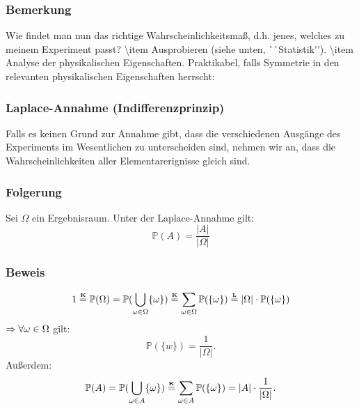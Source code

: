 \subsubsection{Bemerkung}
Wie findet man nun das richtige Wahrscheinlichkeitsma\ss{}, d.h. jenes, welches zu meinem Experiment passt?
\num{
\item Ausprobieren (siehe unten, ``Statistik'').
\item Analyse der physikalischen Eigenschaften. Praktikabel, falls Symmetrie in den relevanten physikalischen Eigenschaften herrscht:
}
\subsubsection{Laplace-Annahme (Indifferenzprinzip)}
Falls es keinen Grund zur Annahme gibt, dass die verschiedenen Ausg\"ange des Experiments im Wesentlichen zu unterscheiden sind, nehmen wir an, dass die Wahrscheinlichkeiten aller Elementarerignisse gleich sind.
\subsubsection{Folgerung}
Sei $\Omega$ ein Ergebnisraum. Unter der Laplace-Annahme gilt:
\[
\mathbb{P}(A)=\frac{|A|}{|\Omega|}
\]
\subsubsection{Beweis}
\[
1\textabove{\tbf{K}}{=}\mathbb{P}(\Omega)=\mathbb{P}(\bigcup_{\omega\in\Omega}\{\omega\})\textabove{\tbf{K}}{=}\sum_{\omega\in\Omega}\mathbb{P}(\{\omega\})\textabove{\tbf{L}}{=}|\Omega|\cdot\mathbb{P}(\{\omega\})
\]
$\Rightarrow\forall\omega\in\Omega$ gilt:
\[
\mathbb{P}(\{w\})=\frac{1}{|\Omega|}.
\]
Au\ss{}erdem:
\[
\mathbb{P}(A)=\mathbb{P}(\bigcup_{\omega\in A}\{\omega\})\textabove{\tbf{K}}{=}\sum_{\omega\in A}\mathbb{P}(\{\omega\})=|A|\cdot\frac{1}{|\Omega|}.
\]
